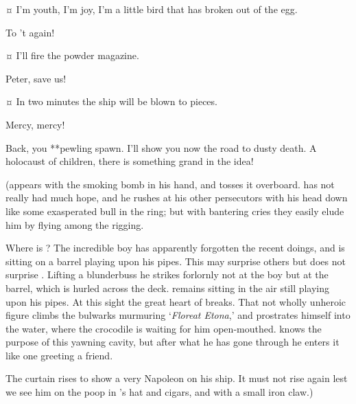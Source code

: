 \begin{drama}

\peterspeaks {}¤
I’m youth, I’m joy, I’m a little bird that has broken out of the egg.

\hookspeaks
To ’t again!


\hookspeaks {}¤
I’ll fire the powder magazine.

Peter, save us!


\hookspeaks {}¤
In two minutes the ship will be blown to pieces.


Mercy, mercy!

\hookspeaks
Back, you **pewling spawn.
I’ll show you now the road to dusty death.
A holocaust of children, there is something grand in the idea!

\begin{stagedir}
(\peter appears with the smoking bomb in his hand, and tosses it overboard.
\hook has not really had much hope,
and he rushes at his other persecutors with his head down like some exasperated bull in the ring;
but with bantering cries they easily elude him by flying among the rigging.

Where is \peter?
The incredible boy has apparently forgotten the recent doings,
and is sitting on a barrel playing upon his pipes.
This may surprise others but does not surprise \hook.
Lifting a blunderbuss he strikes forlornly
not at the boy but at the barrel, which is hurled across the deck.
\peter remains sitting in the air still playing upon his pipes.
At this sight the great heart of \hook breaks.
That not wholly unheroic figure climbs the bulwarks murmuring ‘\emph{Floreat Etona},’
and prostrates himself into the water, where the crocodile is waiting for him open‐mouthed.
\hook knows the purpose of this yawning cavity,
but after what he has gone through he enters it like one greeting a friend.

The curtain rises to show \peter a very Napoleon on his ship.
It must not rise again lest we see him on the poop in \hook’s hat and cigars,
and with a small iron claw.)
\end{stagedir}

\end{drama}

\endinput
